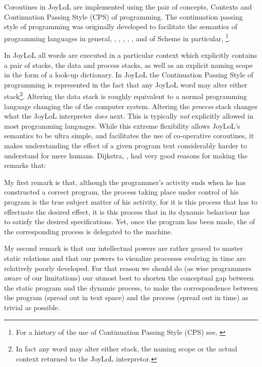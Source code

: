 Coroutines in JoyLoL are implemented using the pair of concepts, Contexts 
and Continuation Passing Style (CPS) of programming. The continuation 
passing style of programming was originally developed to facilitate the 
semantics of programming languages in general, 
\cite{stracheyWadsworth1974continuations}, 
\cite{milne1974semanticsImplementations}, 
\cite{reynolds1974continuationSemantics}, 
\cite{milneStrachey1976theoryProgrammingLanguageSemantics}, 
\cite{stoy1981scottStracheyTheory}, 
\cite{gordon1979denotationalDescriptionProgLangs} and of Scheme in 
particular, \cite{sussmanSteele1975schemeInterpreter}\footnote{For a 
history of the use of Continuation Passing Style (CPS) see, 
\cite{reynolds1993continuationHistory}}. 

In JoyLoL all words are executed in a particular  context 
which explicitly contains a pair of stacks, the data and process stacks, 
as well as an explicit naming scope in the form of a look-up dictionary. 
In JoyLoL the Continuation Passing Style of programming is represented in 
the fact that any JoyLoL word may alter either stack\footnote{In fact any 
word may alter either stack, the naming scope or the actual context 
returned to the JoyLoL interpretor.}. Altering the data stack is roughly 
equivalent to a normal programming language changing the  of 
the computer system. Altering the \emph{process} stack changes what the 
JoyLoL interpreter \emph{does} next. This is typically \emph{not} 
explicitly allowed in most programming languages. While this extreme 
flexibility allows JoyLoL's semantics to be ultra simple, and facilitates 
the use of co-operative coroutines, it makes understanding the effect of a 
given program text considerably harder to understand for mere humans. 
Dijkstra, \cite{dijkstra1968goToHarmful}, had very good reasons for making 
the  remarks that: 

\startblockquote
My first remark is that, although the programmer's activity ends when he 
has constructed a correct program, the process taking place under control 
of his program is the true subject matter of his activity, for it is this 
process that has to effectuate the desired effect, it is this process that 
in its dynamic behaviour has to satisfy the desired specifications. Yet, 
once the program has been made, the  of the corresponding 
process is delegated to the machine.
\stopblockquote

\startblockquote
My second remark is that our intellectual powers are rather geared to 
master static relations and that our powers to visualize processes 
evolving in time are relatively poorly developed. For that reason we 
should do (as wise programmers aware of our limitations) our utmost best 
to shorten the conceptual gap between the static program and the dynamic 
process, to make the correspondence between the program (spread out in 
text space) and the process (spread out in time) as trivial as possible. 
\stopblockquote

